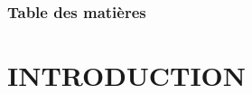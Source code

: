 \documentclass[aspectratio=169,professionalfonts, 12pt]{beamer}
\date{\today}
\begin{document}
\begin{frame}
	\titlepage
\end{frame}
\begin{frame}
	\frametitle{Table des matières}
    \begin{multicols}{2}
    \tableofcontents
    \end{multicols}
\end{frame}

\section{INTRODUCTION}
\end{document}
